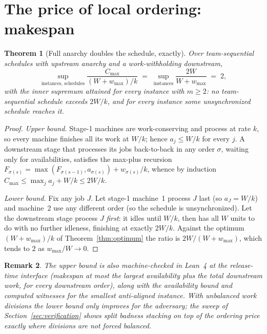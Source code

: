 \documentclass[sn-mathphys,NameDate]{sn-jnl}
\theoremstyle{thmstyleone}
\newtheorem{theorem}{Theorem}
\theoremstyle{thmstylethree}
\theoremstyle{thmstyletwo}
\newtheorem{remark}[theorem]{Remark}
\begin{document}
\section{The price of local ordering: makespan}
\label{sec:makespan}

\begin{theorem}[Full anarchy doubles the schedule, exactly]
\label{thm:poa-full}
Over team-sequential schedules with upstream anarchy and a
work-withholding downstream,
\[
\sup_{\text{instances, schedules}}
\frac{C_{\max}}{(W+w_{\max})/k} \;=\;
\sup_{\text{instances}} \frac{2W}{W + w_{\max}} \;=\; 2,
\]
with the inner supremum attained for every instance with $m \ge 2$:
no team-sequential schedule exceeds $2W/k$, and for every instance
some unsynchronized schedule reaches it.
\end{theorem}

\begin{proof}
\emph{Upper bound.} Stage-1 machines are work-conserving and
process at rate $k$, so every machine finishes all its work at
$W/k$; hence $a_j \le W/k$ for every $j$. A downstream stage that
processes its jobs back-to-back in any order $\sigma$, waiting only
for availabilities, satisfies the max-plus recursion
$F_{\sigma(s)} = \max(F_{\sigma(s-1)}, a_{\sigma(s)}) +
w_{\sigma(s)}/k$, whence by induction
$C_{\max} \le \max_j a_j + W/k \le 2W/k$.

\emph{Lower bound.} Fix any job $J$. Let stage-1 machine~1 process
$J$ last (so $a_J = W/k$) and machine~2 use any different order
(so the schedule is unsynchronized). Let the downstream stage
process $J$ \emph{first}: it idles until $W/k$, then has all $W$
units to do with no further idleness, finishing at exactly $2W/k$.
Against the optimum $(W+w_{\max})/k$ of
Theorem~\ref{thm:optimum} the ratio is $2W/(W+w_{\max})$, which
tends to $2$ as $w_{\max}/W \to 0$.
\end{proof}

\begin{remark}
The upper bound is also machine-checked in Lean~4 at the
release-time interface (makespan at most the largest availability
plus the total downstream work, for every downstream order), along
with the availability bound and computed witnesses for the smallest
anti-aligned instance. With unbalanced work divisions the
\emph{lower} bound only improves for the adversary; the sweep of
Section~\ref{sec:verification} shows split badness stacking on top
of the ordering price exactly where divisions are not forced
balanced.
\end{remark}
\end{document}
